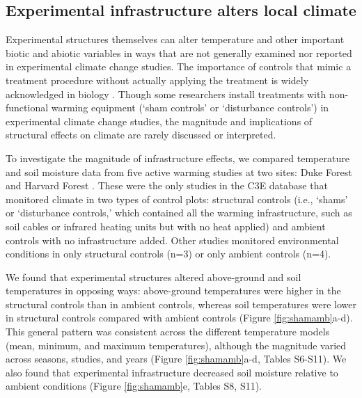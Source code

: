 \documentclass{article}
\begin{document}
\subsection* {Experimental infrastructure alters local climate}
Experimental structures themselves can alter temperature and other important biotic and abiotic variables in ways that are not generally examined nor reported in experimental climate change studies. The importance of controls that mimic a treatment procedure without actually applying the treatment is widely acknowledged in biology \citep[e.g.,][]{spector2001,johnson2002,quinn2002}. Though some researchers install treatments with non-functional warming equipment (`sham controls' or `disturbance controls') in experimental climate change studies, the magnitude and implications of structural effects on climate are rarely discussed or interpreted.
\par To investigate the magnitude of infrastructure effects, we compared temperature and soil moisture data from five active warming studies at two sites: Duke Forest and Harvard Forest \citep{farnsworth1995,clark2014a, marchin2015, pelini2011}. These were the only studies in the C3E database that monitored climate in two types of control plots: structural controls (i.e., `shams' or `disturbance controls,' which contained all the warming infrastructure, such as soil cables or infrared heating units but with no heat applied) and ambient controls with no infrastructure added. Other studies monitored environmental conditions in only structural controls (n=3) or only ambient controls (n=4).

\par We found that experimental structures altered above-ground and soil temperatures in opposing ways: above-ground temperatures were higher in the structural controls than in ambient controls, whereas soil temperatures were lower in structural controls compared with ambient controls (Figure \ref{fig:shamamb}a-d). This general pattern was consistent across the different temperature models (mean, minimum, and maximum temperatures), although the magnitude varied across seasons, studies, and years (Figure \ref{fig:shamamb}a-d, Tables S6-S11). We also found that experimental infrastructure decreased soil moisture relative to ambient conditions (Figure \ref{fig:shamamb}e, Tables S8, S11). 
\end{document}
